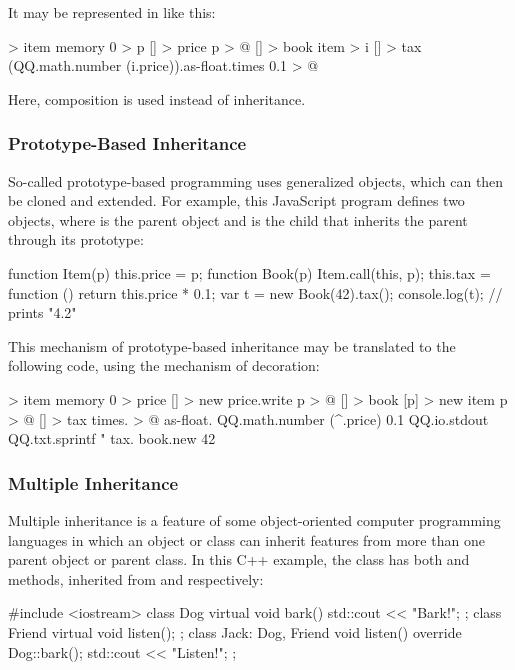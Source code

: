 \documentclass[sigplan,nonacm]{acmart}
\begin{document}
It may be represented in \eolang{} like this:

\begin{ffcode}
[] > item
  memory 0 > p
  [] > price
    p > @
[] > book
  item > i
  [] > tax
    (QQ.math.number (i.price)).as-float.times 0.1 > @
\end{ffcode}

Here, composition is used instead of inheritance.

\subsubsection{Prototype-Based Inheritance}

So-called pro\-to\-type-based programming uses generalized objects, which can then be cloned and extended. For example, this JavaScript program defines two objects, where  is the parent object and  is the child that inherits the parent through its prototype:

\begin{ffcode}
function Item(p) { this.price = p; }
function Book(p) {
  Item.call(this, p);
  this.tax = function () {
    return this.price * 0.1;
  }
}
var t = new Book(42).tax();
console.log(t); // prints "4.2"
\end{ffcode}

This mechanism of prototype-based inheritance may be translated to the following \eolang{} code, using the mechanism of decoration:

\begin{ffcode}
[p] > item
  memory 0 > price
  [] > new
    price.write p > @
[] > book
  [p] > new
    item p > @
    [] > tax
      times. > @
        as-float.
          QQ.math.number (^.price)
        0.1
QQ.io.stdout
  QQ.txt.sprintf
    "%
    tax.
      book.new 42
\end{ffcode}

\subsubsection{Multiple Inheritance}

Multiple inheritance is a feature of some object-oriented computer programming languages in which an object or class can inherit features from more than one parent object or parent class. In this C++ example,
the class  has both  and  methods, inherited from  and  respectively:

\begin{ffcode}
#include <iostream>
class Dog {
  virtual void bark() {
    std::cout << "Bark!";
  }
};
class Friend {
  virtual void listen();
};
class Jack: Dog, Friend {
  void listen() override {
    Dog::bark();
    std::cout << "Listen!";
  }
};
\end{ffcode}
\end{document}
